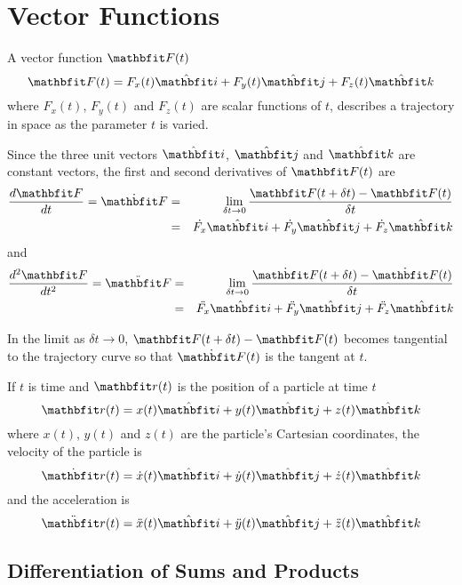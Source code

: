 %
%
%
%
%

\chapter{Vector Functions}
\label{vf chp}

A vector function $\vect{F}(t)$
$$\vect{F}(t)=F_x(t)\ivect+F_y(t)\jvect+F_z(t)\kvect$$
where $F_x(t)$, $F_y(t)$ and $F_z(t)$ are scalar functions of $t$, describes 
a trajectory in space as the parameter $t$ is varied.

Since the three unit vectors $\ivect$, $\jvect$ and $\kvect$ are constant
vectors, the first and second derivatives of $\vect{F}(t)$ are
\begin{eqnarray*}
\der{\vect{F}}{t}=\dot{\vect{F}}
&=&\lim_{\delta t\to 0}\frac{\vect{F}(t+\delta t)-\vect{F}(t)}{\delta t} \\
&=&\dot{F_x}\ivect+\dot{F_y}\jvect+\dot{F_z}\kvect
\end{eqnarray*}
and
\begin{eqnarray*}
\dder{\vect{F}}{t}=\ddot{\vect{F}}
&=&\lim_{\delta t\to 0}\frac{\dot{\vect{F}}(t+\delta t)
-\dot{\vect{F}}(t)}{\delta t} \\
&=&\ddot{F_x}\ivect+\ddot{F_y}\jvect+\ddot{F_z}\kvect
\end{eqnarray*}

In the limit as $\delta t\to 0$, $\vect{F}(t+\delta t)-\vect{F}(t)$ becomes
tangential to the trajectory curve so that $\dot{\vect{F}}(t)$ is the tangent 
at $t$.

If $t$ is time and $\vect{r}(t)$ is the position of a particle at time $t$
$$\vect{r}(t)=x(t)\ivect+y(t)\jvect+z(t)\kvect$$
where $x(t)$, $y(t)$ and $z(t)$ are the particle's Cartesian coordinates, 
the velocity of the particle is
$$\dot{\vect{r}}(t)=\dot{x}(t)\ivect+\dot{y}(t)\jvect+\dot{z}(t)\kvect$$
and the acceleration is 
$$\ddot{\vect{r}}(t)=\ddot{x}(t)\ivect+\ddot{y}(t)\jvect+\ddot{z}(t)\kvect$$


\section{Differentiation of Sums and Products}

